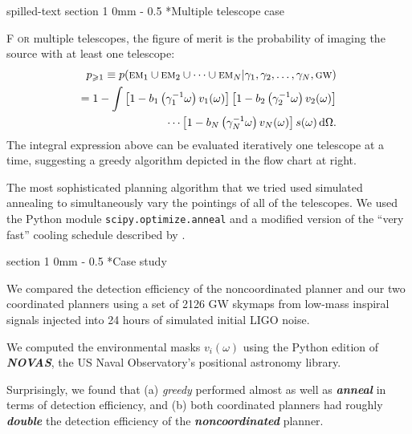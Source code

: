 \documentclass[landscape]{a0poster}
\makeatletter
\newcommand{\EM}[1]{\ensuremath{\textsc{\textrm{em}}_#1}}
\newcommand{\GW}{\ensuremath{\textsc{\textrm{gw}}}}
\newcommand{\dropcap}[2]{\lettrine{\fontspec{Copse}#1}{\textnormal{ #2}}}
\renewcommand{\section}{\@startsection
{section}%
{1}%
{0mm}%
{-\baselineskip}%
{0.5\baselineskip}%
{\fontspec{Marvel Bold}\Huge}} %
\renewcommand{\emph}[1]{{\bfseries\itshape#1}}
\makeatother
\begin{document}
\begin{staticcontents*}{spilled-text}
\section*{Multiple telescope case}

\dropcap{F}{or} multiple telescopes, the figure of merit is the probability of imaging the source with at least one telescope:
%
\begin{align}
	\label{eq:p_any}
	p_{\geqslant 1} \equiv p(\EM{1} \cup \EM{2} \cup \dots \cup \EM{N} | \gamma_1, \gamma_2, \dots, \gamma_N, \GW) \nonumber \\
	= 1 - \int
		\left[ 1 - b_1 \left( \gamma_1^{-1} \omega \right) v_1(\omega) \right]
		\left[ 1 - b_2 \left( \gamma_2^{-1} \omega \right) v_2(\omega) \right] \nonumber \\ \cdots
		\left[ 1 - b_N \left( \gamma_N^{-1} \omega \right) v_N(\omega) \right]
		s(\omega) \, \mathrm{d}\Omega.
\end{align}
%
The integral expression above can be evaluated iteratively one telescope at a time, suggesting a greedy algorithm depicted in the flow chart at right.

The most sophisticated planning algorithm that we tried used simulated annealing to simultaneously vary the pointings of all of the telescopes.  We used the Python module \texttt{scipy.optimize.anneal} and a modified version of the ``very fast'' cooling schedule described by \citet{Ingber1989967}.

\section*{Case study}

We compared the detection efficiency of the noncoordinated planner and our two coordinated planners using a set of 2126 GW skymaps from low-mass inspiral signals injected into 24 hours of simulated initial LIGO noise.

\hspace{2em}We computed the environmental masks $v_i(\omega)$ using the Python edition of \emph{NOVAS}, the US Naval Observatory's positional astronomy library.

\hspace{2em}Surprisingly, we found that (a) \textit{greedy} performed almost as well as \emph{anneal} in terms of detection efficiency, and (b) both coordinated planners had roughly \emph{double} the detection efficiency of the \emph{noncoordinated} planner.
\end{staticcontents*}
\end{document}
